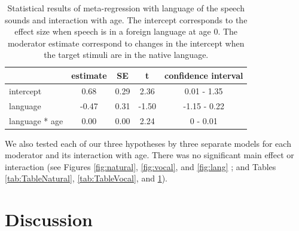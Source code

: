 \documentclass[
  english,
  man]{apa6}
\begin{document}
\begin{table}[tbp]

\begin{center}
\begin{threeparttable}

\caption{\label{tab:TableLang}Statistical results of meta-regression with language of the speech sounds and interaction with age. The intercept corresponds to the effect size when speech is in a foreign language at age 0. The moderator estimate correspond to changes in the intercept when the target stimuli are in the native language.}

\begin{tabular}{lcccc}
\toprule
 & estimate & SE & t & confidence interval\\
\midrule
intercept & 0.68 & 0.29 & 2.36 & 0.01 - 1.35\\
language & -0.47 & 0.31 & -1.50 & -1.15 - 0.22\\
language * age & 0.00 & 0.00 & 2.24 & 0 - 0.01\\
\bottomrule
\end{tabular}

\end{threeparttable}
\end{center}

\end{table}

We also tested each of our three hypotheses by three separate models for each moderator and its interaction with age. There was no significant main effect or interaction (see Figures \ref{fig:natural}, \ref{fig:vocal}, and \ref{fig:lang} ; and Tables \ref{tab:TableNatural}, \ref{tab:TableVocal}, and \ref{tab:TableLang}).

\hypertarget{discussion}{%
\section{Discussion}\label{discussion}}
\end{document}
